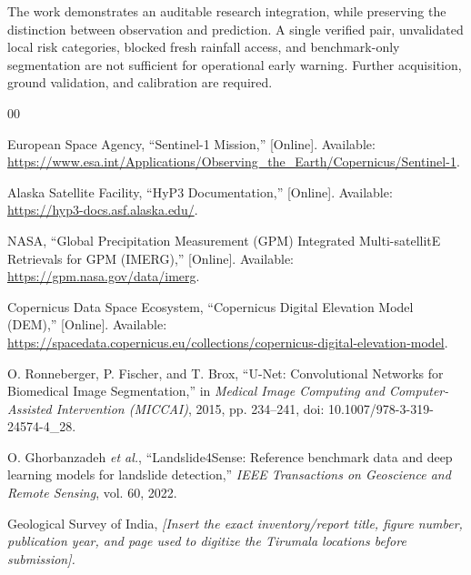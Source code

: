 \documentclass[conference]{IEEEtran}
\begin{document}
The work demonstrates an auditable research integration, while preserving
the distinction between observation and prediction. A single verified pair,
unvalidated local risk categories, blocked fresh rainfall access, and
benchmark-only segmentation are not sufficient for operational early
warning. Further acquisition, ground validation, and calibration are required.

\begin{thebibliography}{00}

European Space Agency, ``Sentinel-1 Mission,'' [Online]. Available:
\url{https://www.esa.int/Applications/Observing_the_Earth/Copernicus/Sentinel-1}.

Alaska Satellite Facility, ``HyP3 Documentation,'' [Online]. Available:
\url{https://hyp3-docs.asf.alaska.edu/}.

NASA, ``Global Precipitation Measurement (GPM) Integrated Multi-satellitE
Retrievals for GPM (IMERG),'' [Online]. Available:
\url{https://gpm.nasa.gov/data/imerg}.

Copernicus Data Space Ecosystem, ``Copernicus Digital Elevation Model
(DEM),'' [Online]. Available:
\url{https://spacedata.copernicus.eu/collections/copernicus-digital-elevation-model}.

O. Ronneberger, P. Fischer, and T. Brox, ``U-Net: Convolutional Networks for
Biomedical Image Segmentation,'' in \textit{Medical Image Computing and
Computer-Assisted Intervention (MICCAI)}, 2015, pp. 234--241,
doi: 10.1007/978-3-319-24574-4\_28.

O. Ghorbanzadeh \textit{et al.}, ``Landslide4Sense: Reference benchmark data
and deep learning models for landslide detection,'' \textit{IEEE
Transactions on Geoscience and Remote Sensing}, vol. 60, 2022.

Geological Survey of India, \textit{[Insert the exact inventory/report title,
figure number, publication year, and page used to digitize the Tirumala
locations before submission].}

\end{thebibliography}
\end{document}

